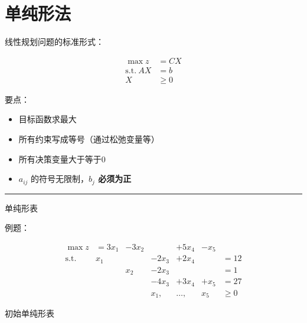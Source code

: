 \documentclass[UTF8, 6pt]{ctexart}
\newcommand{\st}{\text{s.t.}}
\newcommand{\mcompress}{\vspace{-10 px}}
\newcommand{\sectionline}{\rule[2pt]{0.45\textwidth}{0.05em}}
\begin{document}
\scriptsize

\twocolumn

\section{单纯形法}

线性规划问题的标准形式：

\mcompress
\[
\begin{aligned}
\max z &= CX \\
\st\ AX&=b\\
X& \geq 0
\end{aligned}
\]
\mcompress


要点：

\mcompress

\begin{multicols}{2}

\begin{itemize}
	\item 目标函数求最大
	\item 所有约束写成等号（通过松弛变量等）
	\item 所有决策变量大于等于0
	\item $a_{ij}$ 的符号无限制，\textbf{$b_j$ 必须为正}
\end{itemize}
\end{multicols}

\mcompress
\sectionline

单纯形表

例题：

\mcompress
\[
\begin{array}{lrrrrrl}
	\max z & =  3x_1 & -3x_2 &       &   +5x_4 & -x_5 &       \\
	\st    &     x_1 &       & -2x_3 &   +2x_4 &      & =12   \\
	       &         &   x_2 & -2x_3 &         &      & =1    \\
	       &         &       & -4x_3 &   +3x_4 & +x_5 & =27   \\
	       &         &       &  x_1, & \ldots, &  x_5 & \geq0
\end{array} 
\]
\mcompress

初始单纯形表
\end{document}
